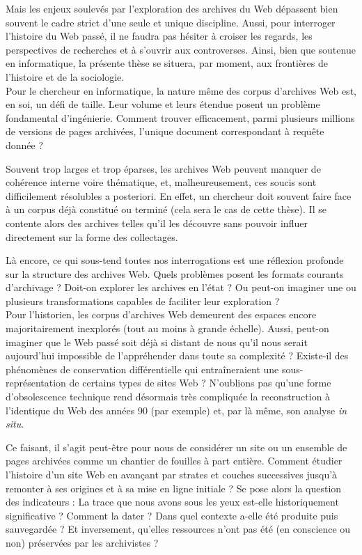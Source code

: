 \documentclass[symmetric,justified,marginals=raggedouter]{tufte-book}
\begin{document}
Mais les enjeux soulevés par l'exploration des archives du Web dépassent bien souvent le cadre strict d'une seule et unique discipline. Aussi, pour interroger l'histoire du Web passé, il ne faudra pas hésiter à croiser les regards, les perspectives de recherches et à s'ouvrir aux controverses. Ainsi, bien que soutenue en informatique, la présente thèse se situera, par moment, aux frontières de l'histoire et de la sociologie.\\

\noindent Pour le chercheur en informatique, la nature même des corpus d'archives Web est, en soi, un défi de taille. Leur volume et leurs étendue posent un problème fondamental d'ingénierie. Comment trouver efficacement, parmi plusieurs millions de versions de pages archivées, l'unique document correspondant à requête donnée ? 

Souvent trop larges et trop éparses, les archives Web peuvent manquer de cohérence interne voire thématique, et, malheureusement, ces soucis sont difficilement résolubles a posteriori. En effet, un chercheur doit souvent faire face à un corpus déjà constitué ou terminé (cela sera le cas de cette thèse). Il se contente alors des archives telles qu'il les découvre sans pouvoir influer directement sur la forme des collectages. 

Là encore, ce qui sous-tend toutes nos interrogations est une réflexion profonde sur la structure des archives Web. Quels problèmes posent les formats courants d'archivage ? Doit-on explorer les archives en l'état ? Ou peut-on imaginer une ou plusieurs transformations capables de faciliter leur exploration ?\\

\noindent Pour l'historien, les corpus d'archives Web demeurent des espaces encore majoritairement inexplorés (tout au moins à grande échelle). Aussi, peut-on imaginer que le Web passé soit déjà si distant de nous qu'il nous serait aujourd'hui impossible de l'appréhender dans toute sa complexité ? Existe-il des phénomènes de conservation différentielle qui entraîneraient une sous-représentation de certains types de sites Web ? N'oublions pas qu'une forme d'obsolescence technique rend désormais très compliquée la reconstruction à l'identique du Web des années 90 (par exemple) et, par là même, son analyse \textit{in situ}. 

Ce faisant, il s'agit peut-être pour nous de considérer un site ou un ensemble de pages archivées comme un chantier de fouilles à part entière. Comment étudier l'histoire d'un site Web en avançant par strates et couches successives jusqu'à remonter à ses origines et à sa mise en ligne initiale ? Se pose alors la question des indicateurs : La trace que nous avons sous les yeux est-elle historiquement significative ? Comment la dater ? Dans quel contexte a-elle été produite puis sauvegardée ? Et inversement, qu'elles ressources n'ont pas été (en conscience ou non) préservées par les archivistes ?\\  
\end{document}
